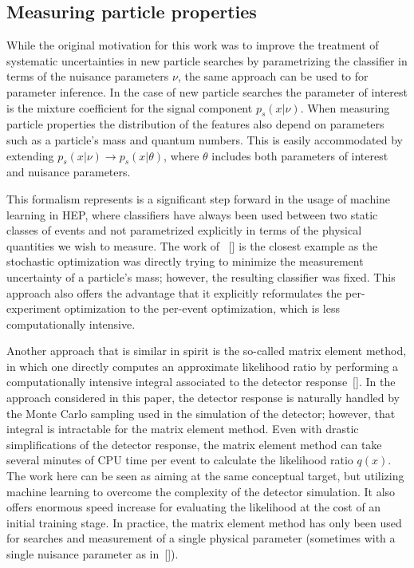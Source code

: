 \documentclass[aoas,preprint]{imsart}
\newcommand{\citek}[1]{[\cite{#1}]}
\numberwithin{equation}{section}
\theoremstyle{plain}
\begin{document}
\subsection{Measuring particle properties}

While the original motivation for this work was to improve the treatment of systematic uncertainties in new particle searches by parametrizing the classifier in terms of the nuisance parameters $\nu$, the same approach can be used to for parameter inference. In the case of new particle searches the parameter of interest is the mixture coefficient for the signal component $p_s(x|\nu)$. When measuring particle properties the distribution of the features also depend on parameters such as a particle's mass and quantum numbers. This is easily accommodated by extending $p_s(x|\nu) \to p_s(x|\theta)$, where $\theta$ includes both parameters of interest and nuisance parameters. 

This formalism represents is a significant step forward in the usage of machine learning in HEP, where classifiers have always been used between two static classes of events and not parametrized explicitly in terms of the physical quantities we wish to measure. The work of  ~\citek{Whiteson:2006ws} is the closest example as the stochastic optimization was directly trying to minimize the measurement uncertainty of a particle's mass; however, the resulting classifier was fixed. This approach also offers the advantage that it explicitly reformulates the per-experiment optimization to the per-event optimization, which is less computationally intensive.

Another approach that is similar in spirit is the so-called matrix element method, in which one  directly computes an approximate likelihood ratio by performing a computationally intensive integral associated to the detector response~\citek{Volobouev:2011vb}. In the approach considered in this paper, the detector response is naturally handled by the Monte Carlo sampling used in the simulation of the detector; however, that integral is intractable for the matrix element method. Even with drastic simplifications of the detector response, the matrix element method can take several minutes of CPU time per event to calculate the likelihood ratio $q(x)$. The work here can be seen as aiming at the same conceptual target, but utilizing machine learning to overcome the complexity of the detector simulation. It also offers enormous speed increase for evaluating the likelihood at the cost of an initial training stage. In practice, the matrix element method has only been used for searches and measurement of a single physical parameter (sometimes with a single nuisance parameter as in~\citek{Aaltonen:2010yz}).
\end{document}
